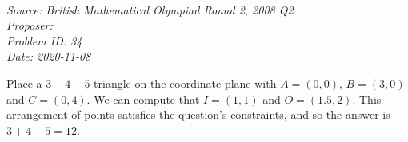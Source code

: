 \SSbreak\\
\emph{Source: British Mathematical Olympiad Round 2, 2008 Q2}\\
\emph{Proposer: \Pss}\\
\emph{Problem ID: 34}\\
\emph{Date: 2020-11-08}\\
\SSbreak

\bigskip 

\begin{solution}\hfil\medskip

    Place a $3-4-5$ triangle on the coordinate plane with $A = (0, 0)$, $B = (3, 0)$ and $C = (0, 4)$. We can compute that $I = (1, 1)$ and $O = (1.5, 2)$. This arrangement of points satisfies the question's constraints, and so the answer is $3 + 4 + 5 = \boxed{12}$. 
\end{solution}\bigskip